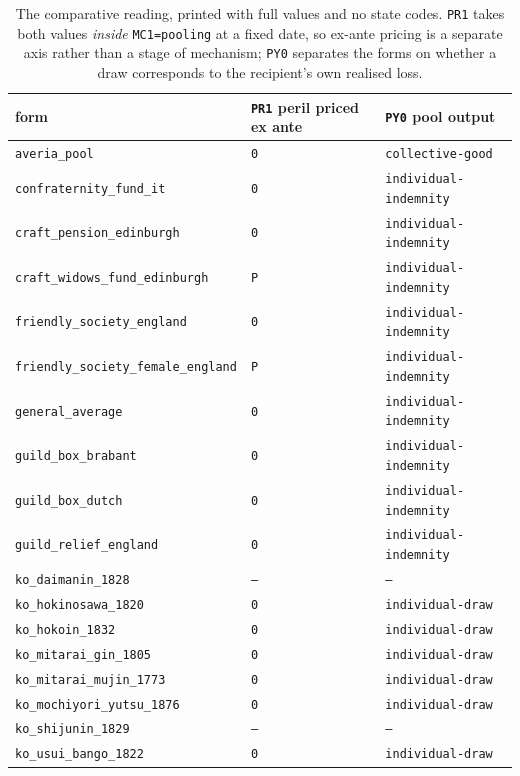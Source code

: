 \documentclass[11pt,a4paper]{article}
\begin{document}
\begin{table}[htbp]\centering\small
\caption{The comparative reading, printed with full values and no state codes. \texttt{PR1} takes both values \emph{inside} \texttt{MC1=pooling} at a fixed date, so ex-ante pricing is a separate axis rather than a stage of mechanism; \texttt{PY0} separates the forms on whether a draw corresponds to the recipient's own realised loss.}
\begin{tabular}{lll}
\toprule
form & \texttt{PR1} peril priced ex ante & \texttt{PY0} pool output \\
\midrule
\texttt{averia\_pool} & \texttt{0} & \texttt{collective-good} \\
\texttt{confraternity\_fund\_it} & \texttt{0} & \texttt{individual-indemnity} \\
\texttt{craft\_pension\_edinburgh} & \texttt{0} & \texttt{individual-indemnity} \\
\texttt{craft\_widows\_fund\_edinburgh} & \texttt{P} & \texttt{individual-indemnity} \\
\texttt{friendly\_society\_england} & \texttt{0} & \texttt{individual-indemnity} \\
\texttt{friendly\_society\_female\_england} & \texttt{P} & \texttt{individual-indemnity} \\
\texttt{general\_average} & \texttt{0} & \texttt{individual-indemnity} \\
\texttt{guild\_box\_brabant} & \texttt{0} & \texttt{individual-indemnity} \\
\texttt{guild\_box\_dutch} & \texttt{0} & \texttt{individual-indemnity} \\
\texttt{guild\_relief\_england} & \texttt{0} & \texttt{individual-indemnity} \\
\texttt{ko\_daimanin\_1828} & \texttt{--} & \texttt{--} \\
\texttt{ko\_hokinosawa\_1820} & \texttt{0} & \texttt{individual-draw} \\
\texttt{ko\_hokoin\_1832} & \texttt{0} & \texttt{individual-draw} \\
\texttt{ko\_mitarai\_gin\_1805} & \texttt{0} & \texttt{individual-draw} \\
\texttt{ko\_mitarai\_mujin\_1773} & \texttt{0} & \texttt{individual-draw} \\
\texttt{ko\_mochiyori\_yutsu\_1876} & \texttt{0} & \texttt{individual-draw} \\
\texttt{ko\_shijunin\_1829} & \texttt{--} & \texttt{--} \\
\texttt{ko\_usui\_bango\_1822} & \texttt{0} & \texttt{individual-draw} \\

\end{tabular}
\end{table}
\end{document}
